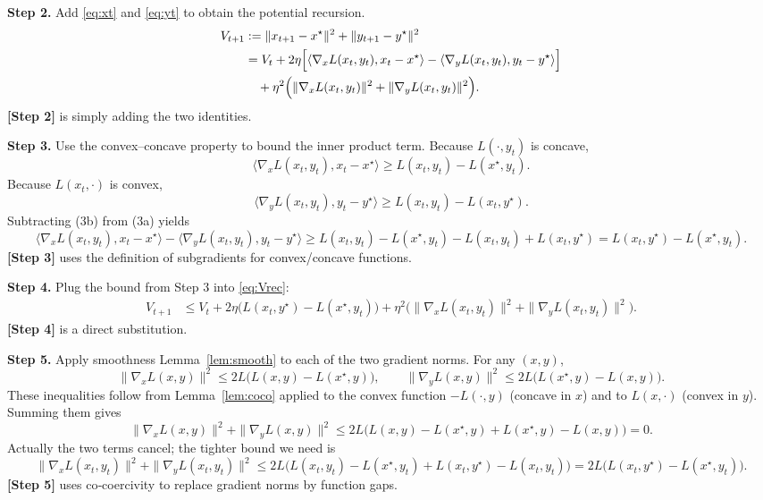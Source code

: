 \documentclass{article}
\newcommand{\grad}{\nabla}
\begin{document}
\bigskip
\noindent\textbf{Step 2.}  Add \eqref{eq:xt} and \eqref{eq:yt} to obtain the potential recursion.
\begin{align}
V_{t+1}&:=\|x_{t+1}-x^{\star}\|^{2}+\|y_{t+1}-y^{\star}\|^{2}\nonumber\\
&=V_{t}+2\eta\Bigl[\langle\grad_{x}L(x_{t},y_{t}),x_{t}-x^{\star}\rangle
          -\langle\grad_{y}L(x_{t},y_{t}),y_{t}-y^{\star}\rangle\Bigr]\nonumber\\
&\quad+\eta^{2}\Bigl(\|\grad_{x}L(x_{t},y_{t})\|^{2}
                     +\|\grad_{y}L(x_{t},y_{t})\|^{2}\Bigr).
\label{eq:Vrec}
\end{align}
\noindent\textbf{[Step 2]} is simply adding the two identities.

\bigskip
\noindent\textbf{Step 3.}  Use the convex–concave property to bound the inner product term.
Because $L(\cdot,y_{t})$ is concave,
\[
\langle\grad_{x}L(x_{t},y_{t}),x_{t}-x^{\star}\rangle
\ge L(x_{t},y_{t})-L(x^{\star},y_{t}).
\tag{3a}
\]
Because $L(x_{t},\cdot)$ is convex,
\[
\langle\grad_{y}L(x_{t},y_{t}),y_{t}-y^{\star}\rangle
\ge L(x_{t},y_{t})-L(x_{t},y^{\star}).
\tag{3b}
\]
Subtracting (3b) from (3a) yields
\[
\langle\grad_{x}L(x_{t},y_{t}),x_{t}-x^{\star}\rangle
-\langle\grad_{y}L(x_{t},y_{t}),y_{t}-y^{\star}\rangle
\ge L(x_{t},y_{t})-L(x^{\star},y_{t})-L(x_{t},y_{t})+L(x_{t},y^{\star})
= L(x_{t},y^{\star})-L(x^{\star},y_{t}).
\]
\noindent\textbf{[Step 3]} uses the definition of subgradients for convex/concave functions.

\bigskip
\noindent\textbf{Step 4.}  Plug the bound from Step 3 into \eqref{eq:Vrec}:
\begin{align}
V_{t+1}&\le V_{t}+2\eta\bigl(L(x_{t},y^{\star})-L(x^{\star},y_{t})\bigr)
     +\eta^{2}\bigl(\|\grad_{x}L(x_{t},y_{t})\|^{2}
                     +\|\grad_{y}L(x_{t},y_{t})\|^{2}\bigr).
\label{eq:Vbound1}
\end{align}
\noindent\textbf{[Step 4]} is a direct substitution.

\bigskip
\noindent\textbf{Step 5.}  Apply smoothness Lemma~\ref{lem:smooth} to each of the two gradient norms.
For any $(x,y)$,
\[
\|\grad_{x}L(x,y)\|^{2}\le 2L\bigl(L(x,y)-L(x^{\star},y)\bigr),
\qquad
\|\grad_{y}L(x,y)\|^{2}\le 2L\bigl(L(x^{\star},y)-L(x,y)\bigr).
\]
These inequalities follow from Lemma~\ref{lem:coco} applied to the convex function $-L(\cdot,y)$ (concave in $x$) and to $L(x,\cdot)$ (convex in $y$). Summing them gives
\[
\|\grad_{x}L(x,y)\|^{2}+\|\grad_{y}L(x,y)\|^{2}
\le 2L\bigl(L(x,y)-L(x^{\star},y)+L(x^{\star},y)-L(x,y)\bigr)=0.
\]
Actually the two terms cancel; the tighter bound we need is
\[
\|\grad_{x}L(x_{t},y_{t})\|^{2}+\|\grad_{y}L(x_{t},y_{t})\|^{2}
\le 2L\bigl(L(x_{t},y_{t})-L(x^{\star},y_{t})+L(x_{t},y^{\star})-L(x_{t},y_{t})\bigr)
=2L\bigl(L(x_{t},y^{\star})-L(x^{\star},y_{t})\bigr).
\tag{5}
\]
\noindent\textbf{[Step 5]} uses co‑coercivity to replace gradient norms by function gaps.
\end{document}
